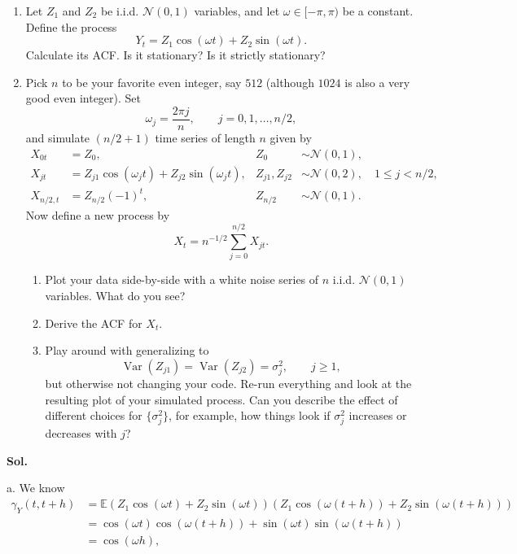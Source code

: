 \documentclass[lang=en,11pt,a4paper,citestyle =authoryear]{elegantpaper}
\begin{document}
\begin{enumerate}[label=\alph*.]
    \item
    Let $Z_1$ and $Z_2$ be i.i.d. $\mathcal{N}(0,1)$ variables, and
    let $\omega\in[-\pi,\pi)$ be a constant. Define the process
    \[
    Y_t=Z_1\cos(\omega t)+Z_2\sin(\omega t).
    \]
    Calculate its ACF. Is it stationary? Is it strictly stationary?

    \item
    Pick $n$ to be your favorite even integer, say $512$ (although
    $1024$ is also a very good even integer). Set
    \[
    \omega_j=\frac{2\pi j}{n},
    \qquad j=0,1,\ldots,n/2,
    \]
    and simulate $(n/2+1)$ time series of length $n$ given by
    \begin{align*}
    X_{0t}
      &=Z_0,
      & Z_0&\sim\mathcal{N}(0,1),\\
    X_{jt}
      &=Z_{j1}\cos(\omega_jt)+Z_{j2}\sin(\omega_jt),
      & Z_{j1},Z_{j2}&\sim\mathcal{N}(0,2),
      \quad 1\le j<n/2,\\
    X_{n/2,t}
      &=Z_{n/2}(-1)^t,
      & Z_{n/2}&\sim\mathcal{N}(0,1).
    \end{align*}
    Now define a new process by
    \[
    X_t=n^{-1/2}\sum_{j=0}^{n/2}X_{jt}.
    \]

    \begin{enumerate}[label=\arabic*.]
        \item
        Plot your data side-by-side with a white noise series of $n$
        i.i.d. $\mathcal{N}(0,1)$ variables. What do you see?

        \item
        Derive the ACF for $X_t$.

        \item
        Play around with generalizing to
        \[
        \operatorname{Var}(Z_{j1})
        =\operatorname{Var}(Z_{j2})
        =\sigma_j^2,
        \qquad j\ge1,
        \]
        but otherwise not changing your code. Re-run everything and
        look at the resulting plot of your simulated process. Can you
        describe the effect of different choices for
        $\{\sigma_j^2\}$, for example, how things look if
        $\sigma_j^2$ increases or decreases with $j$?
    \end{enumerate}
\end{enumerate}
\vspace{0.5em}
\textbf{Sol.} \par
a. We know
\[
\begin{aligned}
    \gamma_Y(t,t+h) &= \mathbb{E}(Z_1\cos(\omega t) +Z_2 \sin(\omega t))(Z_1\cos(\omega(t+h)) +Z_2 \sin(\omega(t+h))) \\ &= \cos(\omega t)\cos(\omega(t+h)) + \sin(\omega t)\sin(\omega(t+h)) \\
    &=\cos(\omega h),
\end{aligned} 
\]
\end{document}
